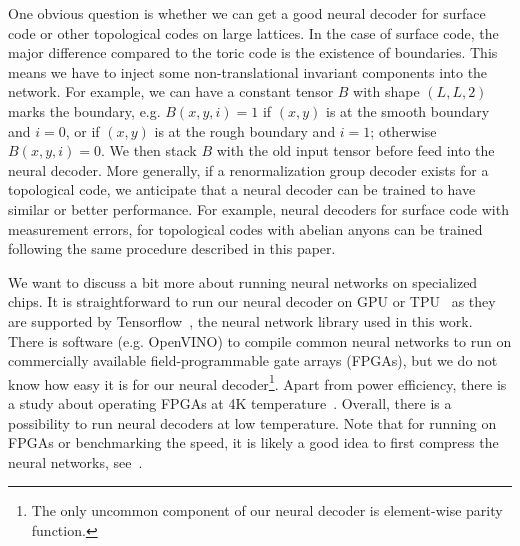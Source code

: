 One obvious question is whether we can get a good neural decoder for surface code or other topological codes on large lattices.
In the case of surface code, the major difference compared to the toric code is the existence of boundaries.
This means we have to inject some non-translational invariant components into the network.
For example, we can have a constant tensor $B$ with shape $(L,L,2)$ marks the boundary, e.g. $B(x, y, i)=1$ if $(x,y)$ is at the smooth boundary and $i=0$, or if $(x,y)$ is at the rough boundary and $i=1$; otherwise $B(x, y, i)=0$.
We then stack $B$ with the old input tensor before feed into the neural decoder.
More generally, if a renormalization group decoder exists for a topological code, we anticipate that a neural decoder can be trained to have similar or better performance.
For example, neural decoders for surface code with measurement errors, for topological codes with abelian anyons can be trained following the same procedure described in this paper.

We want to discuss a bit more about running neural networks on specialized chips.
It is straightforward to run our neural decoder on GPU or TPU~\cite{jouppi2017TPU} as they are supported by Tensorflow~\cite{tensorflow2015-whitepaper}, the neural network library used in this work.
There is software (e.g. OpenVINO) to compile common neural networks to run on commercially available field-programmable gate arrays (FPGAs), but we do not know how easy it is for our neural decoder\footnote{The only uncommon component of our neural decoder is element-wise parity function.}.
Apart from power efficiency, there is a study about operating FPGAs at 4K temperature~\cite{Lamb2016AnFPGAbased}.
Overall, there is a possibility to run neural decoders at low temperature.
Note that for running on FPGAs or benchmarking the speed, it is likely a good idea to first compress the neural networks, see~\cite{Cheng2018ModelCompression}.